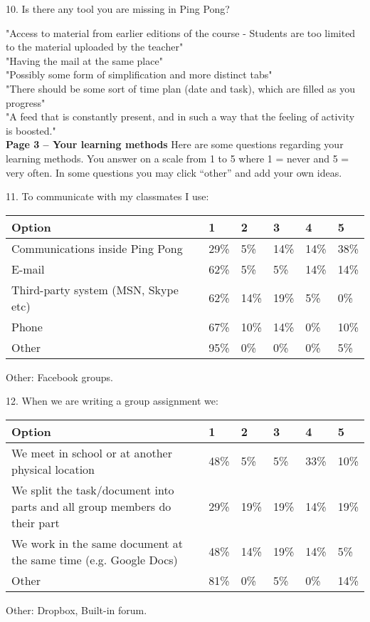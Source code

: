 10. Is there any tool you are missing in Ping Pong?


	"Access to material from earlier editions of the course - Students are too limited to the material uploaded by the teacher" \\
	"Having the mail at the same place" \\
	"Possibly some form of simplification and more distinct tabs" \\
	"There should be some sort of time plan (date and task), which are filled as you progress" \\
	"A feed that is constantly present, and in such a way that the feeling of activity is boosted." \\

\textbf {Page 3 – Your learning methods}
Here are some questions regarding your learning methods. You answer on a scale from 1 to 5 where 1 = never and 5 = very often. In some questions you may click “other” and add your own ideas.

11. To communicate with my classmates I use:

\begin{center}
    \begin{tabular}{ | l | l | l | l | l | l |}
    \hline
    Option & 1 & 2 & 3 & 4 & 5 \\ \hline
	Communications inside Ping Pong & 29\% & 5\% & 14\% & 14\% & 38\% \\ \hline
	E-mail & 62\% & 5\% & 5\% & 14\% & 14\% \\ \hline
	Third-party system (MSN, Skype etc) & 62\% & 14\% & 19\% & 5\% & 0\%\\ \hline
	Phone & 67\% & 10\% & 14\% & 0\% & 10\% \\ \hline
	Other & 95\%& 0\% & 0\% & 0\% & 5\% \\ \hline
    \end{tabular}
    Other: Facebook groups.
\end{center}

12. When we are writing a group assignment we:

\begin{center}
    \begin{tabular}{ | p{8cm} | l | l | l | l | l |}
    \hline
    Option & 1 & 2 & 3 & 4 & 5 \\ \hline
	We meet in school or at another physical location & 48\% & 5\% & 5\% & 33\% & 10\% \\ \hline
	We split the task/document into parts and all group members do their part & 29\% & 19\% & 19\% & 14\% & 19\% \\ \hline
	We work in the same document at the same time (e.g. Google Docs) & 48\% & 14\% & 19\% & 14\% & 5\%\\ \hline
	Other & 81\%& 0\% & 5\% & 0\% & 14\% \\ \hline
    \end{tabular}
    Other: Dropbox, Built-in forum.
\end{center}

